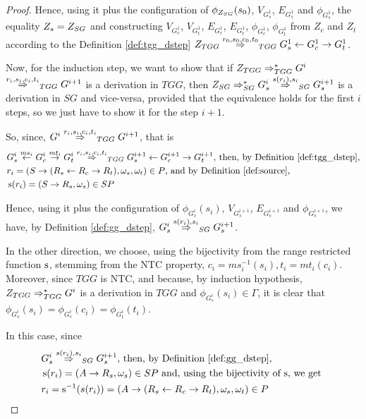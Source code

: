 \documentclass[]{report}
\begin{document}
\begin{proof}
	Hence, using it plus the configuration of $\phi_{Z_{SG}}(s_0)$, $V_{G^1_s}$, $E_{G^1_s}$ and $\phi_{G^1_s}$, the equality $Z_s = Z_{SG}$ and constructing $V_{G^1_c}$, $V_{G^1_t}$, $E_{G^1_c}$, $E_{G^1_t}$, $\phi_{G^1_c}$, $\phi_{G^1_t}$ from $Z_c$ and $Z_t$ according to the Definition \ref{def:tgg_dstep} $\startTG{TGG} \tderiv{r_0}{s_0,c_0,t_0}{TGG} G^1_s \ms{} G^1_c \mt{} G^1_t$.
	
	Now, for the induction step, we want to show that if $Z_{TGG} \Rightarrow^*_{TGG} G^i$ $\tderiv{r_{i}}{s_{i},c_{i},t_{i}}{TGG} G^{i+1}$ is a derivation in $TGG$, then $\startG{SG} \derivtr{SG} G^i_s \deriv{s(r_{i})}{s_{i}}{SG} G^{i+1}_s$ is a derivation in $SG$ and vice-versa, provided that the equivalence holds for the first $i$ steps, so we just have to show it for the step $i+1$.
	
	So, since, $G^i \tderiv{r_{i}}{s_{i},c_{i},t_{i}}{TGG} G^{i+1}$, that is
	\begin{align*}
		& G^i_s \ms{ms_i} G^i_c \mt{mt_i} G^i_t \tderiv{r_i}{s_i,c_i,t_i}{TGG} G^{i+1}_s \ms{} G^{i+1}_c \mt{} G^{i+1}_t \text{, then, by Definition \ref{def:tgg_dstep},}\\
		& r_i = (S \pro (R_s \ms{} R_c \mt{} R_t), \omega_s, \omega_t) \in P \text{, and by Definition \ref{def:source},}\\
		& \source(r_i) = (S \pro R_s, \omega_s) \in SP
	\end{align*}
	
	Hence, using it plus the configuration of $\phi_{G^i_s}(s_i)$, $V_{G^{i+1}_s}$, $E_{G^{i+1}_s}$ and $\phi_{G^{i+1}_s}$, we have, by Definition \ref{def:gg_dstep}, $G_s^i \deriv{\source(r_i)}{s_i}{SG} G^{i+1}_s$.
	
	In the other direction, we choose, using the bijectivity from the range restricted function $\operatorname{s}$, stemming from the NTC property, $c_i = ms_i^{-1}(s_i), t_i = mt_i(c_i)$. Moreover, since $TGG$ is NTC, and because, by induction hypothesis, $Z_{TGG} \Rightarrow^*_{TGG} G^i$ is a derivation in $TGG$ and $\phi_{G^i_s}(s_i) \in \Gamma$, it is clear that $\phi_{G^i_s}(s_i) = \phi_{G^i_c}(c_i) = \phi_{G^i_t}(t_i)$.
	
	In this case, since
	\begin{align*}
		& G^{i}_s \deriv{s(r_i)}{s_i}{SG} G^{i+1}_s \text{, then, by Definition \ref{def:gg_dstep},}\\
		& \source(r_i) = (A \pro R_s, \omega_s) \in SP \text{ and, using the bijectivity of $\source$, we get }\\
		& r_i = \source^{-1}(s(r_i)) = (A \pro (R_s \ms{} R_c \mt{} R_t), \omega_s, \omega_t) \in P
	\end{align*} 
	

\end{proof}
\end{document}
